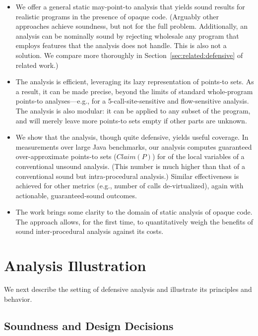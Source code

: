 \begin{itemize}
\item We offer a general static may-point-to analysis that yields sound results for realistic programs in the presence of opaque code. (Arguably other approaches \cite{ecoop:2004:Hirzel,article:2007:Hirzel,pldi:2007:Lattner} achieve soundness, but not for the full problem. Additionally, an analysis can be nominally sound by rejecting wholesale any program that employs features that the analysis does not handle. This is also not a solution. We compare more thoroughly in Section~\ref{sec:related:defensive} of related work.)

\item The analysis is efficient, leveraging its lazy representation of points-to sets. As a result, it can be made precise, beyond the limits of standard whole-program points-to analyses---e.g., for a 5-call-site-sensitive and flow-sensitive analysis. The analysis is also modular: it can be applied to any subset of the program, and will merely leave more points-to sets empty if other parts are unknown.
  
\item We show that the analysis, though quite defensive, yields useful coverage. In measurements over large Java benchmarks, our analysis computes guaranteed over-approximate points-to sets ($Claim(P)$) for  of the local variables of a conventional unsound analysis. (This number is much higher than that of a conventional sound but intra-procedural analysis.) Similar effectiveness is achieved for other metrics (e.g., number of calls de-virtualized), again with actionable, guaranteed-sound outcomes.

\item The work brings some clarity to the domain of static analysis of opaque code. The approach allows, for the first time, to quantitatively weigh the benefits of sound inter-procedural analysis against its costs.
\end{itemize}


\section{Analysis Illustration}

We next describe the setting of defensive analysis and illustrate its principles and behavior.

\subsection{Soundness and Design Decisions}

